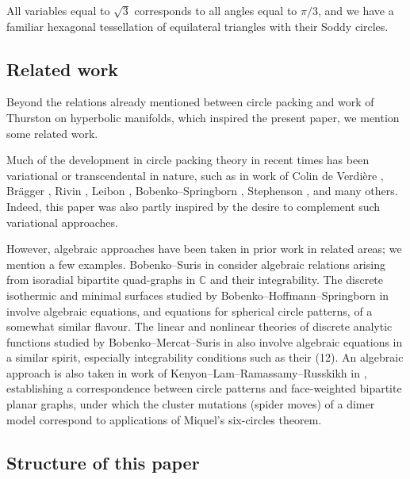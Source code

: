 \documentclass[12pt]{amsart}
\numberwithin{equation}{section}
\theoremstyle{named}
\begin{document}
All variables equal to $\sqrt{3}$ corresponds to all angles equal to $\pi/3$, and we have a familiar hexagonal tessellation of equilateral triangles with their Soddy circles.

\subsection{Related work}
Beyond the relations already mentioned between circle packing and work of Thurston \cite{Thurston_notes} on hyperbolic manifolds, which inspired the present paper, we mention some related work.

Much of the development in circle packing theory in recent times has been variational or transcendental in nature, such as in work of Colin de Verdi\`{e}re \cite{deVerdiereCercles}, Br\"{a}gger \cite{BraggerKreispackungen}, Rivin \cite{RivinEuclidStructure}, Leibon \cite{LeibonDelaunayTriang}, Bobenko--Springborn \cite{BobenkoVariationalPrinciples}, Stephenson \cite{StephensonKenneth2005Itcp}, and many others.
Indeed, this paper was also partly inspired by the desire to complement such variational approaches.

However, algebraic approaches have been taken in prior work in related areas; we mention a few examples.  Bobenko--Suris in \cite{BobenkoIntegrableSystems} consider algebraic relations arising from isoradial bipartite quad-graphs in $\mathbb{C}$ and their integrability. The discrete isothermic and minimal surfaces studied by Bobenko--Hoffmann--Springborn in \cite{BobenkoMinimalSurfaces} involve algebraic equations, and equations for spherical circle patterns, 
of a somewhat similar flavour. The linear and nonlinear theories of discrete analytic functions studied by Bobenko--Mercat--Suris in \cite{BobenkoLinearNonlinear} also involve algebraic equations in  a similar spirit, especially integrability conditions such as their (12).
An algebraic approach is also taken in work of Kenyon--Lam--Ramassamy--Russkikh in \cite{KenyonDimerCircle}, establishing a correspondence between circle patterns and face-weighted bipartite planar graphs, under which the cluster mutations (spider moves) of a dimer model correspond to applications of Miquel's six-circles theorem. 

\subsection{Structure of this paper}
\end{document}
